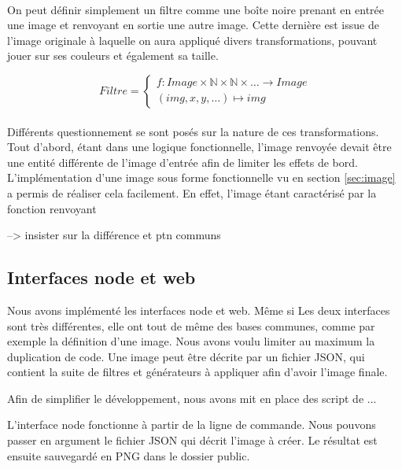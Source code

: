 \documentclass{article}
\begin{document}
\paragraph{}
On peut définir simplement un filtre comme une boîte noire prenant en entrée une image et renvoyant en sortie une autre image. Cette dernière est issue de l'image originale à laquelle on aura appliqué divers transformations, pouvant jouer sur ses couleurs et également sa taille.

\begin{equation*}
    Filtre = \left\{\begin{matrix}
                f : Image \times \mathbb{N} \times \mathbb{N} \times \dots \rightarrow Image \\ 
                (img, x,y, \dots) \mapsto img
\end{matrix}\right.
\end{equation*}

\paragraph{}
Différents questionnement se sont posés sur la nature de ces transformations. Tout d'abord, étant dans une logique fonctionnelle, l'image renvoyée devait être une entité différente de l'image d'entrée afin de limiter les effets de bord. L'implémentation d'une image sous forme fonctionnelle vu en section \ref{sec:image} a permis de réaliser cela facilement. En effet, l'image étant caractérisé par la fonction renvoyant  

--> insister sur la différence et ptn communs

\subsection{Interfaces node et web}
Nous avons implémenté les interfaces node et web. Même si Les deux interfaces sont très différentes, elle ont tout de même des bases communes, comme par exemple la définition d'une image. Nous avons voulu limiter au maximum la duplication de code. Une image peut être décrite par un fichier JSON, qui contient la suite de filtres et générateurs à appliquer afin d'avoir l'image finale.

Afin de simplifier le développement, nous avons mit en place des script de ...

L'interface node fonctionne à partir de la ligne de commande. 
Nous pouvons passer en argument le fichier JSON qui décrit l'image à créer. Le résultat est ensuite sauvegardé en PNG dans le dossier public.
\end{document}
